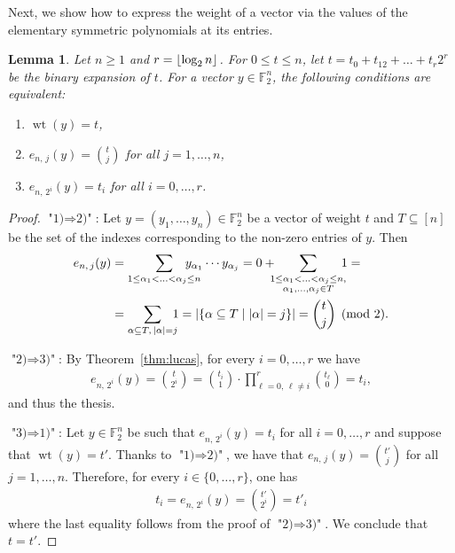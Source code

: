 \documentclass[11pt]{article}
\newcommand{\F}[0]{\mathbb{F}}
\newcommand{\es}[2]{e_{#1,\, #2}}
\DeclarePairedDelimiter{\fl}{\lfloor}{\rfloor}
\theoremstyle{plain}
\newtheorem{lem}[theo]{Lemma}
\theoremstyle{definition}
\theoremstyle{remark}
\begin{document}
Next, we show how to express the weight of a vector via the values of the elementary symmetric polynomials at its entries.

\begin{lem}\label{lemESPweight}
    Let $n\geq 1$ and $r=\fl*{\operatorname{log}_2 n}$. For $0\leq t\leq n$, let $t = t_0 + t_12 + \dots + t_r2^r$ be the binary expansion of $t$. For a vector $y\in\F_2^n$, the following conditions are equivalent:
    \begin{enumerate}[label=\arabic*)]
        \item $\operatorname{wt}(y)=t$,
        \item $\es{n}{j}(y)=\binom{t}{j}$ for all $j=1,\dots,n$,
        \item $\es{n}{2^i}(y)=t_i$ for all $i=0,\dots,r$.
    \end{enumerate}
\end{lem}
\begin{proof}
    $\textit{"1)}\Rightarrow\textit{2)"}$: Let $y=(y_1,\dots,y_n)\in\F_2^n$ be a vector of weight $t$ and $T\subseteq [n]$ be the set of the indexes corresponding to the non-zero entries of $y$. %
    Then
    \begin{align*}
        \es{n}{j}(y)
        &=\sum_{1\leq\alpha_1<\ldots<\alpha_j\leq n}\hspace{-0.5cm}y_{\alpha_1}\cdots y_{\alpha_j}
        =0+\hspace{-0.2cm}\sum_{\substack{1\leq\alpha_1<\ldots<\alpha_j\leq n,\\ \alpha_1,\ldots,\alpha_j\in T}}\hspace{-0.2cm}1=\\
        &=\sum_{\alpha\subseteq T,\,|\alpha|=j}\hspace{-0.2cm}1
        =|\{\alpha\subseteq T\mid |\alpha|=j\}|
        =\binom{t}{j}\pmod{2}.
    \end{align*}
    
    $\textit{"2)}\Rightarrow\textit{3)"}$: By Theorem~\ref{thm:lucas}, for every $i=0,\dots,r$ we have
    \begin{align*}
        \es{n}{2^i}(y)=\binom{t}{2^i}=\binom{t_i}{1}\cdot\prod_{\ell=0,\,\ell\neq i}^r \binom{t_\ell}{0}%
        =t_i,
    \end{align*}
    and thus the thesis.
    
    $\textit{"3)}\Rightarrow\textit{1)"}$: Let $y\in\F_2^n$ be such that $\es{n}{2^i}(y)=t_i$ for all $i=0,\dots,r$ and suppose that $\operatorname{wt}(y)=t'$. Thanks to $\textit{"1)}\Rightarrow\textit{2)"}$, we have that $\es{n}{j}(y)=\binom{t'}{j}$ for all $j=1,\dots,n$. Therefore, for every $i\in\{0,\ldots,r\}$, one has
    \begin{align*}
        t_i=\es{n}{2^i}(y)=\binom{t'}{2^i}=t'_i
    \end{align*}
    where the last equality follows from the proof of $\textit{"2)}\Rightarrow\textit{3)"}$. We conclude that $t=t'$.
    
\end{proof}
\end{document}
